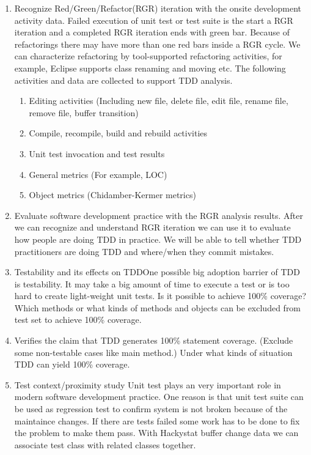 \begin{enumerate}
\item Recognize Red/Green/Refactor(RGR) iteration with the onsite
   development activity data. Failed execution of unit test or test suite
   is the start a RGR iteration and a completed RGR iteration ends with
   green bar. Because of refactorings there may have more than one red bars
   inside a RGR cycle. We can characterize refactoring by tool-supported
   refactoring activities, for example, Eclipse supports class renaming and
   moving etc. The following activities and data are collected to support
   TDD analysis.

     \begin{enumerate}
     \item Editing activities (Including new file, delete file, edit file, rename
     file, remove file, buffer transition)
     \item Compile, recompile, build and rebuild activities
     \item Unit test invocation and test results
     \item General metrics (For example, LOC)
     \item Object metrics (Chidamber-Kermer metrics)
     \end{enumerate}

\item Evaluate software development practice with the RGR analysis
results. After we can recognize and understand RGR iteration we can use
it to evaluate how people are doing TDD in practice. We will be able to
tell whether TDD practitioners are doing TDD and where/when they commit
mistakes.

\item Testability and its effects on TDD\newline One possible big adoption
barrier of TDD is testability. It may take a big amount of time to execute
a test or is too hard to create light-weight unit tests. Is it possible to
achieve 100\% coverage? Which methods or what kinds of methods and objects
can be excluded from test set to achieve 100\% coverage.

\item Verifies the claim that TDD generates 100\% statement
coverage. (Exclude some non-testable cases like main method.) Under what
kinds of situation TDD can yield 100\% coverage.

\item Test context/proximity study \newline Unit test plays an very
  important role in modern software development practice. One reason is
  that unit test suite can be used as regression test to confirm system is
  not broken because of the maintaince changes. If there are tests failed
  some work has to be done to fix the problem to make them pass. With
  Hackystat buffer change data we can associate test class with related
  classes together.
\end{enumerate}

  











